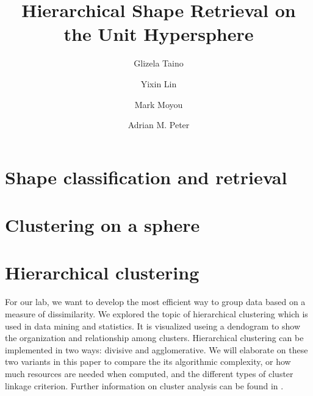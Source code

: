 \documentclass{article}
\begin{document}
\title{Hierarchical Shape Retrieval on the Unit Hypersphere}
\author{Glizela Taino}
\author{Yixin Lin}
\author{Mark Moyou}
\author{Adrian M. Peter}
\setcounter{Maxaffil}{0}
\renewcommand\Affilfont{\small}
\date{}
\maketitle




\part{Shape classification and retrieval}
  
  
  
  

\part{Clustering on a sphere}


  
  
  
  

\part{Hierarchical clustering}

  For our lab, we want to develop the most efficient way to group data
  based on a measure of dissimilarity. We explored the topic of
  hierarchical clustering which is used in data mining and statistics.
  It is visualized useing a dendogram to show the organization and relationship
  among clusters. Hierarchical clustering can be implemented in two
  ways: divisive and agglomerative. We will elaborate on these two variants
  in this paper to compare the its algorithmic complexity, or how much
  resources are needed when computed, and the different types of cluster
  linkage criterion. Further information on cluster analysis can be
  found in \cite{ClusterAnalysis}.
\end{document}
